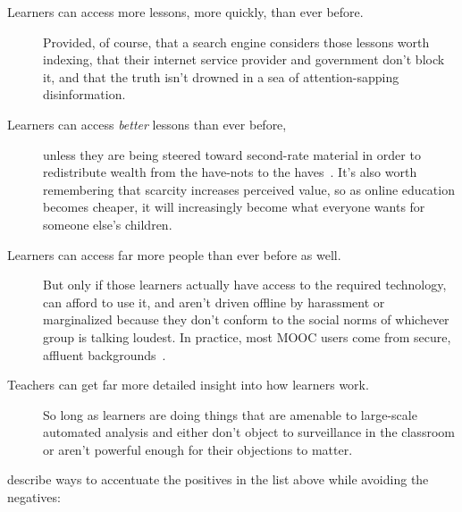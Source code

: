 \begin{description}

\item[Learners can access more lessons, more quickly, than ever before.]
  Provided,
  of course,
  that a search engine considers those lessons worth indexing,
  that their internet service provider and government don't block it,
  and that the truth isn't drowned in a sea of attention-sapping disinformation.

\item[Learners can access \emph{better} lessons than ever before,]
  unless they are being steered toward second-rate material
  in order to redistribute wealth from the have-nots to the haves~\cite{McMi2017}.
  It's also worth remembering that scarcity increases perceived value,
  so as online education becomes cheaper,
  it will increasingly become what everyone wants for someone else's children.

\item[Learners can access far more people than ever before as well.]
  But only if those learners actually have access to the required technology,
  can afford to use it,
  and aren't driven offline by harassment or marginalized
  because they don't conform to the social norms of whichever group is talking loudest.
  In practice,
  most MOOC users come from secure, affluent backgrounds~\cite{Hans2015}.

\item[Teachers can get far more detailed insight into how learners work.]
  So long as learners are doing things that are amenable to large-scale automated analysis
  and either don't object to surveillance in the classroom
  or aren't powerful enough for their objections to matter.

\end{description}

\cite{Marg2015,Mill2016a,Nils2017} describe ways to accentuate the positives in the list above
while avoiding the negatives:

